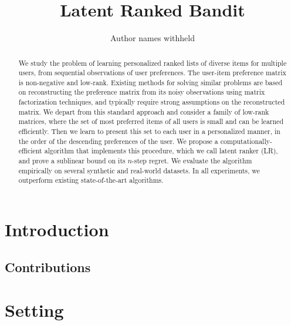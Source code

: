 \documentclass[letterpaper]{article} %
\begin{document}
%
\title{Latent Ranked Bandit}
\author{Author names withheld}
\maketitle
\begin{abstract}
We study the problem of learning personalized ranked lists of diverse items for multiple users, from sequential observations of user preferences. The user-item preference matrix is non-negative and low-rank. Existing methods for solving similar problems are based on reconstructing the preference matrix from its noisy observations using matrix factorization techniques, and typically require strong assumptions on the reconstructed matrix. We depart from this standard approach and consider a family of low-rank matrices, where the set of most preferred items of all users is small and can be learned efficiently. Then we learn to present this set to each user in a personalized manner, in the order of the descending preferences of the user. We propose a computationally-efficient algorithm that implements this procedure, which we call latent ranker (LR), and prove a sublinear bound on its $n$-step regret. We evaluate the algorithm empirically on several synthetic and real-world datasets. In all experiments, we outperform existing state-of-the-art algorithms.
\end{abstract}

\section{Introduction}
\label{intro}


\subsection{Contributions}
\label{Contribution}


\section{Setting}
\label{sec:setting}

\end{document}
